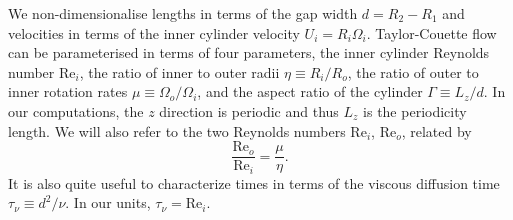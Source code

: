 \documentclass[openacc]{rstransa}%
\newcommand{\Reyn}{\mathrm{Re}}
\begin{document}
We non-dimensionalise lengths in terms of the gap width $d = R_2 - R_1$ and velocities in terms of the inner cylinder velocity $U_i = R_i \Omega_i$. Taylor-Couette flow can be parameterised in terms of four parameters, the inner cylinder Reynolds number $\Reyn_i$, the ratio of inner to outer radii $\eta \equiv R_i/R_o$, the ratio of outer to inner rotation rates $\mu \equiv \Omega_o/\Omega_i$, and the aspect ratio of the cylinder $\Gamma \equiv L_z/d$. In our computations, the $z$ direction is periodic and thus $L_z$ is the periodicity length. We will also refer to the two Reynolds numbers $\Reyn_i$, $\Reyn_o$, related by
\begin{equation}
    \frac{\Reyn_o}{\Reyn_i} = \frac{\mu}{\eta}.
\end{equation}
It is also quite useful to characterize times in terms of the viscous diffusion time $\tau_\nu \equiv d^2/\nu$. In our units, $\tau_\nu = \Reyn_i$.
\end{document}
